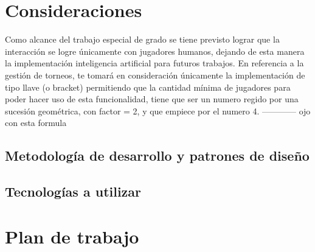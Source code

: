\section{Consideraciones}

Como alcance del trabajo especial de grado se tiene previsto lograr que la interacción se logre únicamente con jugadores humanos, dejando de esta manera la implementación inteligencia artificial para futuros trabajos. En referencia a la gestión de torneos, te tomará en consideración únicamente la implementación de tipo llave (o bracket) permitiendo que la cantidad mínima de jugadores para poder hacer uso de esta funcionalidad, tiene que ser un numero regido por una sucesión geométrica, con factor = 2, y que empiece por el numero 4.  ------------ ojo con esta formula

\subsection{Metodología de desarrollo y patrones de diseño}

\subsection{Tecnologías a utilizar}

\section{Plan de trabajo}
